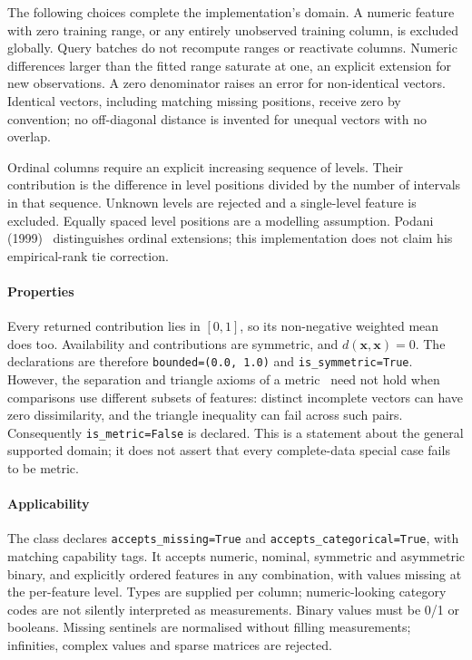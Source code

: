 The following choices complete the implementation's domain. A numeric
feature with zero training range, or any entirely unobserved training
column, is excluded globally. Query batches do not recompute ranges or
reactivate columns. Numeric differences larger than the fitted range
saturate at one, an explicit extension for new observations. A zero
denominator raises an error for non-identical vectors. Identical vectors,
including matching missing positions, receive zero by convention; no
off-diagonal distance is invented for unequal vectors with no overlap.

Ordinal columns require an explicit increasing sequence of levels.
Their contribution is the difference in level positions divided by the
number of intervals in that sequence. Unknown levels are rejected and a
single-level feature is excluded. Equally spaced level positions are a
modelling assumption. Podani (1999)~\cite{ref_33} distinguishes ordinal
extensions; this implementation does not claim his empirical-rank tie
correction.

\paragraph{Properties}
\label{sec:measure:gower:properties}
Every returned contribution lies in $[0,1]$, so its non-negative weighted
mean does too. Availability and contributions are symmetric, and
$d(\mathbf{x},\mathbf{x})=0$. The declarations are therefore
\texttt{bounded=(0.0, 1.0)} and \texttt{is\_symmetric=True}.
However, the separation and triangle axioms of a metric~\cite{ref_8} need
not hold when comparisons use different subsets of features: distinct
incomplete vectors can have zero dissimilarity, and the triangle
inequality can fail across such pairs. Consequently
\texttt{is\_metric=False} is declared. This is a statement about the
general supported domain; it does not assert that every complete-data
special case fails to be metric.

\paragraph{Applicability}
\label{sec:measure:gower:applicability}
The class declares \texttt{accepts\_missing=True} and
\texttt{accepts\_categorical=True}, with matching capability tags. It
accepts numeric, nominal, symmetric and asymmetric binary, and explicitly
ordered features in any combination, with values missing at the
per-feature level. Types are supplied per column; numeric-looking
category codes are not silently interpreted as measurements. Binary
values must be 0/1 or booleans. Missing sentinels are normalised without
filling measurements; infinities, complex values and sparse matrices are
rejected.

